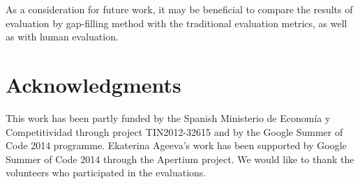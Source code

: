 \documentclass[11pt]{article}
\newcommand{\comment}[1]{}
\begin{document}
As a consideration for future work, it may be beneficial to compare the results of evaluation by gap-filling method with the traditional evaluation metrics, as well as with human evaluation.

\section*{Acknowledgments}

This work has been partly funded by the Spanish Ministerio de Econom{\'i}a y Competitividad through project TIN2012-32615 and by the Google Summer of Code 2014 programme. Ekaterina Ageeva's work has been supported by Google Summer of Code 2014 through the Apertium project. We would like to thank the volunteers who participated in the evaluations.



\comment{EA: urls do not show up in web citations, how can I fix that?}

\end{document}
